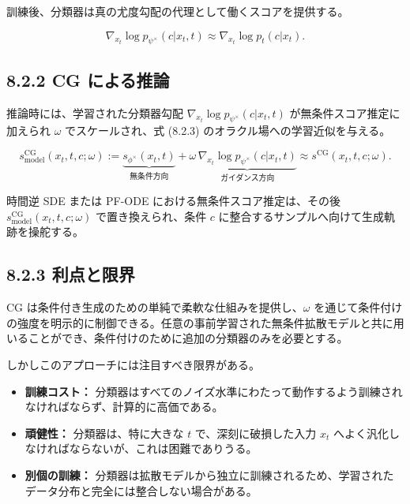 訓練後、分類器は真の尤度勾配の代理として働くスコアを提供する。

\[
\nabla_{x_t}\log p_{\psi^\times}(c|x_t,t)\approx\nabla_{x_t}\log p_t(c|x_t).
\]


\subsection*{8.2.2 CG による推論}


推論時には、学習された分類器勾配 $\nabla_{x_t}\log p_{\psi^\times}(c|x_t,t)$ が無条件スコア推定に加えられ $\omega$ でスケールされ、式 (8.2.3) のオラクル場への学習近似を与える。

\[
s^{\mathrm{CG}}_{\mathrm{model}}(x_t,t,c;\omega)
:=
\underbrace{s_{\phi^\times}(x_t,t)}_{\text{無条件方向}}
+
\omega\,\underbrace{\nabla_{x_t}\log p_{\psi^\times}(c|x_t,t)}_{\text{ガイダンス方向}}
\approx
s^{\mathrm{CG}}(x_t,t,c;\omega).
\]


時間逆 SDE または PF-ODE における無条件スコア推定は、その後 $s^{\mathrm{CG}}_{\mathrm{model}}(x_t,t,c;\omega)$ で置き換えられ、条件 $c$ に整合するサンプルへ向けて生成軌跡を操舵する。

\subsection*{8.2.3 利点と限界}


CG は条件付き生成のための単純で柔軟な仕組みを提供し、$\omega$ を通じて条件付けの強度を明示的に制御できる。任意の事前学習された無条件拡散モデルと共に用いることができ、条件付けのために追加の分類器のみを必要とする。

しかしこのアプローチには注目すべき限界がある。

\begin{itemize}
\item \textbf{訓練コスト：} 分類器はすべてのノイズ水準にわたって動作するよう訓練されなければならず、計算的に高価である。
\item \textbf{頑健性：} 分類器は、特に大きな $t$ で、深刻に破損した入力 $x_t$ へよく汎化しなければならないが、これは困難でありうる。
\item \textbf{別個の訓練：} 分類器は拡散モデルから独立に訓練されるため、学習されたデータ分布と完全には整合しない場合がある。
\end{itemize}




